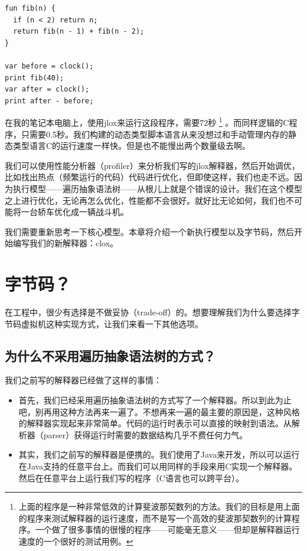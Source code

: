 \documentclass[cn,10pt,math=newtx,citestyle=gb7714-2015,bibstyle=gb7714-2015]{elegantbook}
\begin{document}
\begin{verbatim}
fun fib(n) {
  if (n < 2) return n;
  return fib(n - 1) + fib(n - 2); 
}

var before = clock();
print fib(40);
var after = clock();
print after - before;
\end{verbatim}

在我的笔记本电脑上，使用jlox来运行这段程序，需要72秒 \footnote{上面的程序是一种非常低效的计算斐波那契数列的方法。我们的目标是用上面的程序来测试解释器的运行速度，而不是写一个高效的斐波那契数列的计算程序。一个做了很多事情的很慢的程序——可能毫无意义——但却是解释器运行速度的一个很好的测试用例。} 。而同样逻辑的C程序，只需要0.5秒。我们构建的动态类型脚本语言从来没想过和手动管理内存的静态类型语言C的运行速度一样快。但是也不能慢出两个数量级去啊。

我们可以使用性能分析器（profiler）来分析我们写的jlox解释器，然后开始调优，比如找出热点（频繁运行的代码）代码进行优化，但即使这样，我们也走不远。因为执行模型——遍历抽象语法树——从根儿上就是个错误的设计。我们在这个模型之上进行优化，无论再怎么优化，性能都不会很好。就好比无论如何，我们也不可能将一台轿车优化成一辆战斗机。

我们需要重新思考一下核心模型。本章将介绍一个新执行模型以及字节码，然后开始编写我们的新解释器：clox。

\section{字节码？}

在工程中，很少有选择是不做妥协（trade-off）的。想要理解我们为什么要选择字节码虚拟机这种实现方式，让我们来看一下其他选项。

\subsection{为什么不采用遍历抽象语法树的方式？}

我们之前写的解释器已经做了这样的事情：

\begin{itemize}
   \item 首先，我们已经采用遍历抽象语法树的方式写了一个解释器。所以到此为止吧，别再用这种方法再来一遍了。不想再来一遍的最主要的原因是，这种风格的解释器实现起来非常简单。代码的运行时表示可以直接的映射到语法。从解析器（parser）获得运行时需要的数据结构几乎不费任何力气。
   \item 其实，我们之前写的解释器是便携的。我们使用了Java来开发，所以可以运行在Java支持的任意平台上。而我们可以用同样的手段来用C实现一个解释器。然后在任意平台上运行我们写的程序（C语言也可以跨平台）。
\end{itemize}
\end{document}
